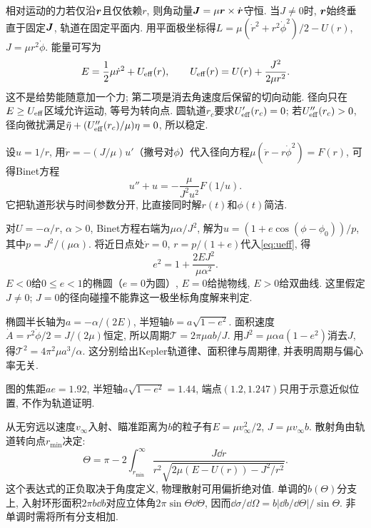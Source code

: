 相对运动的力若仅沿$\boldsymbol{r}$且仅依赖$r$, 则角动量$\boldsymbol{J}=\mu\boldsymbol{r}\times\dot{\boldsymbol{r}}$守恒. 当$J\ne0$时, $\boldsymbol{r}$始终垂直于固定$\boldsymbol{J}$, 轨道在固定平面内. 用平面极坐标得$L=\mu(\dot r^2+r^2\dot\phi^2)/2-U(r)$, $J=\mu r^2\dot\phi$. 能量可写为
\begin{equation}\label{eq:ueff}
E=\frac12\mu\dot r^2+U_{\rm eff}(r),\qquad
U_{\rm eff}(r)=U(r)+\frac{J^2}{2\mu r^2}.
\end{equation}
这不是给势能随意加一个力; 第二项是消去角速度后保留的切向动能. 径向只在$E\ge U_{\rm eff}$区域允许运动, 等号为转向点. 圆轨道$r_c$要求$U'_{\rm eff}(r_c)=0$; 若$U''_{\rm eff}(r_c)>0$, 径向微扰满足$\ddot\eta+(U''_{\rm eff}(r_c)/\mu)\eta=0$, 所以稳定.

设$u=1/r$, 用$\dot r=-(J/\mu)u'$（撇号对$\phi$）代入径向方程$\mu(\ddot r-r\dot\phi^2)=F(r)$, 可得Binet方程
\[
u''+u=-\frac{\mu}{J^2u^2}F(1/u).
\]
它把轨道形状与时间参数分开, 比直接同时解$r(t)$和$\phi(t)$简洁.

对$U=-\alpha/r$, $\alpha>0$, Binet方程右端为$\mu\alpha/J^2$, 解为$u=(1+e\cos(\phi-\phi_0))/p$, 其中$p=J^2/(\mu\alpha)$. 将近日点处$\dot r=0$, $r=p/(1+e)$代入\eqref{eq:ueff}, 得
\[
e^2=1+\frac{2EJ^2}{\mu\alpha^2}.
\]
$E<0$给$0\le e<1$的椭圆（$e=0$为圆）, $E=0$给抛物线, $E>0$给双曲线. 这里假定$J\ne0$; $J=0$的径向碰撞不能靠这一极坐标角度解来判定.

椭圆半长轴为$a=-\alpha/(2E)$, 半短轴$b=a\sqrt{1-e^2}$. 面积速度$\dot A=r^2\dot\phi/2=J/(2\mu)$恒定, 所以周期$\mathcal T=2\pi\mu ab/J$. 用$J^2=\mu\alpha a(1-e^2)$消去$J$, 得$\mathcal T^2=4\pi^2\mu a^3/\alpha$. 这分别给出Kepler轨道律、面积律与周期律, 并表明周期与偏心率无关.

\begin{center}
\end{center}
图的焦距$ae=1.92$, 半短轴$a\sqrt{1-e^2}=1.44$, 端点$(1.2,1.247)$只用于示意近似位置, 不作为轨道证明.

从无穷远以速度$v_\infty$入射、瞄准距离为$b$的粒子有$E=\mu v_\infty^2/2$, $J=\mu v_\infty b$. 散射角由轨道转向点$r_{\min}$决定:
\[
\Theta=\pi-2\int_{r_{\min}}^\infty
\frac{J\dd r}{r^2\sqrt{2\mu(E-U(r))-J^2/r^2}}.
\]
这个表达式的正负取决于角度定义, 物理散射可用偏折绝对值. 单调的$b(\Theta)$分支上, 入射环形面积$2\pi b\dd b$对应立体角$2\pi\sin\Theta\dd\Theta$, 因而$\dd\sigma/\dd\Omega=b|\dd b/\dd\Theta|/\sin\Theta$. 非单调时需将所有分支相加.

